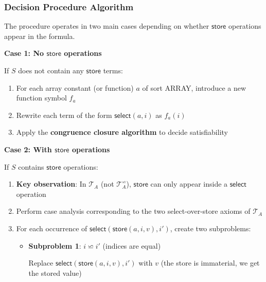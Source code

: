 \documentclass[11pt,a4paper]{article}
\theoremstyle{definition}
\theoremstyle{plain}
\theoremstyle{remark}
\begin{document}
\subsubsection{Decision Procedure Algorithm}

\begin{tcolorbox}[colback=green!5!white,colframe=green!75!black,title=\textbf{Array Theory Decision Procedure}]
The procedure operates in two main cases depending on whether $\textsf{store}$ operations appear in the formula.

\vspace{0.5em}

\textbf{Case 1: No $\textsf{store}$ operations}

If $S$ does not contain any $\textsf{store}$ terms:
\begin{enumerate}
    \item For each array constant (or function) $a$ of sort \textsf{ARRAY}, introduce a new function symbol $f_a$
    \item Rewrite each term of the form $\textsf{select}(a, i)$ as $f_a(i)$
    \item Apply the \textbf{congruence closure algorithm} to decide satisfiability
\end{enumerate}

\vspace{0.5em}

\textbf{Case 2: With $\textsf{store}$ operations}

If $S$ contains $\textsf{store}$ operations:
\begin{enumerate}
    \item \textbf{Key observation}: In $\mathcal{T}_A$ (not $\mathcal{T}_A^{\backsimeq}$), $\textsf{store}$ can only appear inside a $\textsf{select}$ operation
    
    \item Perform case analysis corresponding to the two select-over-store axioms of $\mathcal{T}_A$
    
    \item For each occurrence of $\textsf{select}(\textsf{store}(a, i, v), i')$, create two subproblems:
    \begin{itemize}
        \item \textbf{Subproblem 1}: $i \backsimeq i'$ (indices are equal)
        
        Replace $\textsf{select}(\textsf{store}(a, i, v), i')$ with $v$ (the store is immaterial, we get the stored value)
        

\end{itemize}
\end{enumerate}
\end{tcolorbox}
\end{document}
